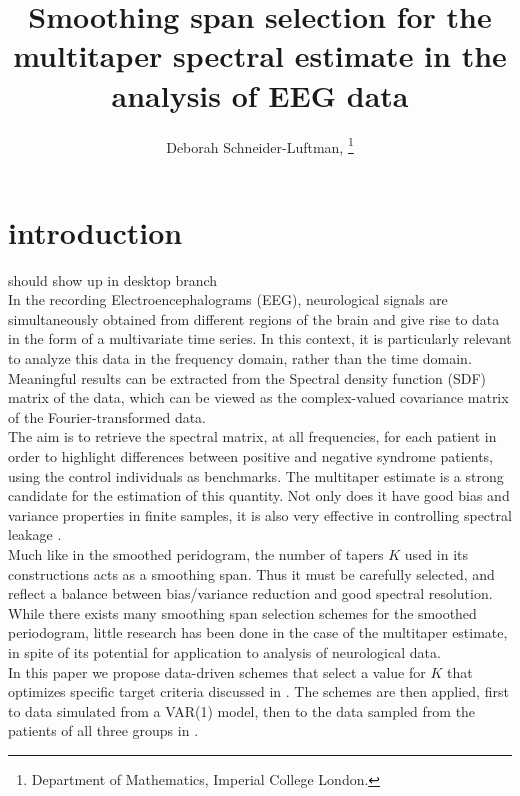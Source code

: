 \documentclass[9pt,journal]{IEEEtran}
\numberwithin{equation}{section}
\begin{document}
\title{Smoothing span selection for the multitaper spectral estimate in the analysis of EEG data}
\author{Deborah Schneider-Luftman, 
\thanks{ Department of Mathematics, Imperial College London.}}
%
{ }
\maketitle

\section{introduction}
{\color{red} should show up in desktop branch}\\
In the recording  Electroencephalograms (EEG), neurological signals are simultaneously
obtained from different regions of the brain and give rise to data in the form of a multivariate
time series. In this context, it is particularly relevant to analyze this data in the frequency domain, rather than the time domain. Meaningful results can be extracted from the Spectral density function (SDF) matrix of the data, which can be viewed as the complex-valued covariance matrix of the Fourier-transformed data.\\
The aim is to retrieve the spectral matrix, at all frequencies, for each patient in order to highlight differences between positive and negative syndrome patients, using the control individuals as benchmarks. The multitaper estimate is a strong candidate for the estimation of this quantity.  Not only does it have good bias and variance properties in finite samples, it is also very effective in controlling spectral leakage \cite{Percival1993}. \\
Much like in the smoothed peridogram, the number of tapers $K$ used in its constructions acts as a smoothing span. Thus it must be carefully selected, and reflect a balance between bias/variance reduction and good spectral resolution.\\
While there exists many smoothing span selection schemes for the smoothed periodogram, little research has been done in the case of the multitaper estimate, in spite of its potential for application to analysis of neurological data.\\
In this paper we propose data-driven schemes that select a value for $K$ that optimizes specific target criteria discussed in . The schemes are then applied, first to data simulated from a VAR(1) model, then to the data sampled from the patients of all three groups in .
\end{document}
